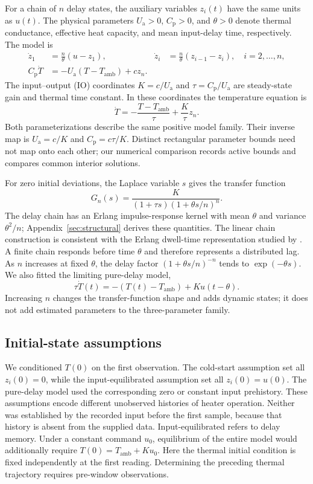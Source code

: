 \documentclass[11pt]{article}
\newcommand{\Ua}{U_{\mathrm a}}
\newcommand{\Cp}{C_{\mathrm p}}
\newcommand{\Tamb}{T_{\mathrm{amb}}}
\begin{document}
For a chain of $n$ delay states, the auxiliary variables $z_i(t)$ have the same
units as $u(t)$. The physical parameters $\Ua>0$, $\Cp>0$, and $\theta>0$
denote thermal conductance, effective heat capacity, and mean input-delay time,
respectively. The model is
\begin{align}
 \dot z_1 &= \frac{n}{\theta}(u-z_1), &
 \dot z_i &= \frac{n}{\theta}(z_{i-1}-z_i),\quad i=2,\ldots,n,\label{eq:chain}\\
 \Cp\dot T &= -\Ua(T-\Tamb)+c z_n.\label{eq:physical}
\end{align}
The input--output (IO) coordinates $K=c/\Ua$ and $\tau=\Cp/\Ua$ are steady-state
gain and thermal time constant. In these coordinates the temperature equation is
\begin{equation}
 \dot T=-\frac{T-\Tamb}{\tau}+\frac{K}{\tau}z_n.
 \label{eq:io}
\end{equation}
Both parameterizations describe the same positive model family. Their inverse
map is $\Ua=c/K$ and $\Cp=c\tau/K$. Distinct rectangular parameter bounds need
not map onto each other; our numerical comparison records active bounds and
compares common interior solutions.

For zero initial deviations, the Laplace variable $s$ gives the transfer function
\begin{equation}
 G_n(s)=\frac{K}{(1+\tau s)(1+\theta s/n)^n}.
 \label{eq:transfer}
\end{equation}
The delay chain has an Erlang impulse-response kernel with mean $\theta$ and
variance $\theta^2/n$; Appendix~\ref{sec:structural} derives these quantities.
The linear chain construction is consistent with the Erlang dwell-time
representation studied by \citet{hurtado-2019-generalizations}. A finite chain
responds before time $\theta$ and therefore represents a distributed lag. As
$n$ increases at fixed $\theta$, the delay factor $(1+\theta s/n)^{-n}$ tends to
$\exp(-\theta s)$. We also fitted the limiting pure-delay model,
\begin{equation}
 \tau\dot T(t)=-(T(t)-\Tamb)+K u(t-\theta).
 \label{eq:puredelay}
\end{equation}
Increasing $n$ changes the transfer-function shape and adds dynamic states;
it does not add estimated parameters to the three-parameter family.

\subsection{Initial-state assumptions}
We conditioned $T(0)$ on the first observation. The cold-start assumption set
all $z_i(0)=0$, while the input-equilibrated assumption set all $z_i(0)=u(0)$.
The pure-delay model used the corresponding zero or constant input prehistory.
These assumptions encode different unobserved histories of heater operation.
Neither was established by the recorded input before the first sample, because
that history is absent from the supplied data.
Input-equilibrated refers to delay memory. Under a constant command $u_0$,
equilibrium of the entire model would additionally require
$T(0)=\Tamb+Ku_0$. Here the thermal initial condition is fixed independently
at the first reading. Determining the preceding thermal trajectory requires
pre-window observations.
\end{document}
